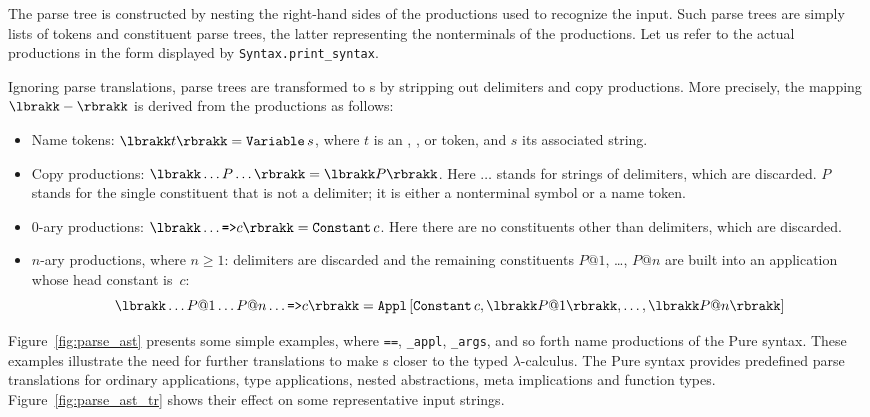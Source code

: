 The parse tree is constructed by nesting the right-hand sides of the
productions used to recognize the input.  Such parse trees are simply lists
of tokens and constituent parse trees, the latter representing the
nonterminals of the productions.  Let us refer to the actual productions in
the form displayed by {\tt Syntax.print_syntax}.

Ignoring parse \AST{} translations, parse trees are transformed to \AST{}s
by stripping out delimiters and copy productions.  More precisely, the
mapping $\astofpt{-}$ is derived from the productions as follows:
\begin{itemize}
\item Name tokens: $\astofpt{t} = \Variable s$, where $t$ is an ,
  ,  or  token, and $s$ its associated string.

\item Copy productions:
  $\astofpt{\ldots P \ldots} = \astofpt{P}$.  Here $\ldots$ stands for
  strings of delimiters, which are discarded.  $P$ stands for the single
  constituent that is not a delimiter; it is either a nonterminal symbol or
  a name token.

  \item 0-ary productions: $\astofpt{\ldots \mtt{=>} c} = \Constant c$.
    Here there are no constituents other than delimiters, which are
    discarded. 

  \item $n$-ary productions, where $n \ge 1$: delimiters are discarded and
    the remaining constituents $P@1$, \ldots, $P@n$ are built into an
    application whose head constant is~$c$:
    \[ \astofpt{\ldots P@1 \ldots P@n \ldots \mtt{=>} c} = 
       \Appl{\Constant c, \astofpt{P@1}, \ldots, \astofpt{P@n}}
    \]
\end{itemize}
Figure~\ref{fig:parse_ast} presents some simple examples, where {\tt ==},
{\tt _appl}, {\tt _args}, and so forth name productions of the Pure syntax.
These examples illustrate the need for further translations to make \AST{}s
closer to the typed $\lambda$-calculus.  The Pure syntax provides
predefined parse \AST{} translations for
ordinary applications, type applications, nested abstractions, meta
implications and function types.  Figure~\ref{fig:parse_ast_tr} shows their
effect on some representative input strings.


